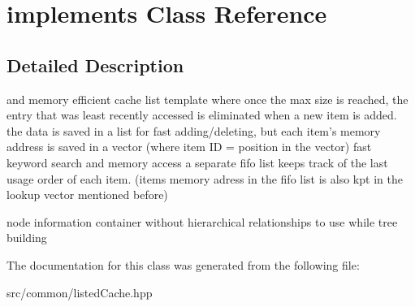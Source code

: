 \hypertarget{classimplements}{\section{implements \-Class \-Reference}
\label{classimplements}
}


\subsection{\-Detailed \-Description}
and memory efficient cache list template where once the max size is reached, the entry that was least recently accessed is eliminated when a new item is added. the data is saved in a list for fast adding/deleting, but each item's memory address is saved in a vector (where item \-I\-D = position in the vector) fast keyword search and memory access a separate fifo list keeps track of the last usage order of each item. (items memory adress in the fifo list is also kpt in the lookup vector mentioned before)

node information container without hierarchical relationships to use while tree building 

\-The documentation for this class was generated from the following file\-:\begin{DoxyCompactItemize}
\item 
src/common/listed\-Cache.\-hpp\end{DoxyCompactItemize}
